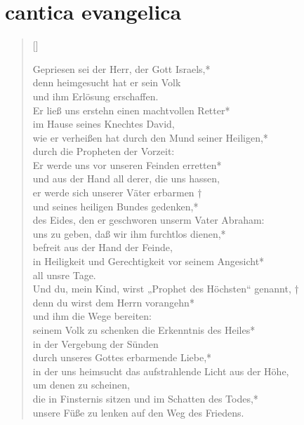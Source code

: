 
\thispagestyle{plain}



\section{cantica evangelica}



\begin{verse}[\versewidth]


Gepriesen sei der Herr, der Gott Israels,*\\
denn heimgesucht hat er sein Volk\\
und ihm Erlösung erschaffen.\\
\vin Er ließ uns erstehn einen machtvollen Retter*\\
\vin im Hause seines Knechtes David,\\
wie er verheißen hat durch den Mund seiner Heiligen,*\\
durch die Propheten der Vorzeit:\\
 \vin Er werde uns vor unseren Feinden erretten*\\
\vin und aus der Hand all derer, die uns hassen,\\
er werde sich unserer Väter erbarmen †\\
und seines heiligen Bundes gedenken,*\\
des Eides, den er geschworen unserm Vater Abraham:\\
\vin uns zu geben, daß wir ihm furchtlos dienen,*\\
\vin befreit aus der Hand der Feinde,\\
in Heiligkeit und Gerechtigkeit vor seinem Angesicht*\\
all unsre Tage.\\

\vin Und du, mein Kind, wirst „Prophet des Höchsten“ genannt, †\\
\vin denn du wirst dem Herrn vorangehn*\\
\vin und ihm die Wege bereiten:\\
seinem Volk zu schenken die Erkenntnis des Heiles*\\
in der Vergebung der Sünden\\
\vin durch unseres Gottes erbarmende Liebe,*\\
\vin in der uns heimsucht das aufstrahlende Licht aus der Höhe,\\
um denen zu scheinen,\\
die in Finsternis sitzen und im Schatten des Todes,*\\
 unsere Füße zu lenken auf den Weg des Friedens.\\

 
\end{verse}

